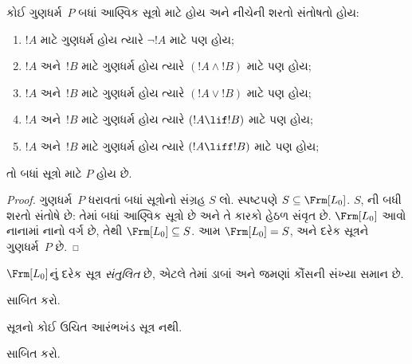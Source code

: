 \begin{thm}[\emph{સૂત્રો પર અનુમાનનો સિદ્ધાંત}]
  કોઈ ગુણધર્મ~$P$ બધાં આણ્વિક સૂત્રો માટે હોય અને નીચેની
  શરતો સંતોષતો હોય:
  \begin{enumerate}
    \item $!A$ માટે ગુણધર્મ હોય ત્યારે $\lnot !A$ માટે
      પણ હોય;
    \item $!A$ અને~$!B$ માટે ગુણધર્મ હોય ત્યારે
      $(!A \land !B)$ માટે પણ હોય;
    \item $!A$ અને~$!B$ માટે ગુણધર્મ હોય ત્યારે
      $(!A \lor !B)$ માટે પણ હોય;
    \item $!A$ અને~$!B$ માટે ગુણધર્મ હોય ત્યારે
      $(!A \lif !B)$ માટે પણ હોય;
    \item $!A$ અને~$!B$ માટે ગુણધર્મ હોય ત્યારે
      $(!A \liff !B)$ માટે પણ હોય;
  \end{enumerate}
  તો બધાં સૂત્રો માટે $P$ હોય છે.
\end{thm}

\begin{proof}
  ગુણધર્મ~$P$ ધરાવતાં બધાં સૂત્રોનો સંગ્રહ $S$ લો. સ્પષ્ટપણે
  $S \subseteq \Frm[L_0]$. $S$, ની બધી
  શરતો સંતોષે છે: તેમાં બધાં આણ્વિક સૂત્રો છે અને તે
  કારકો હેઠળ સંવૃત છે. $\Frm[L_0]$ આવો નાનામાં નાનો વર્ગ છે,
  તેથી $\Frm[L_0] \subseteq S$. આમ $\Frm[L_0]=S$, અને દરેક સૂત્રને
  ગુણધર્મ~$P$ છે.
\end{proof}

\begin{prop}
   $\Frm[L_0]$નું દરેક સૂત્ર \emph{સંતુલિત} છે, એટલે તેમાં
   ડાબાં અને જમણાં કૌંસની સંખ્યા સમાન છે.
\end{prop}

\begin{prob}
 સાબિત કરો.
\end{prob}

\begin{prop} 
સૂત્રનો કોઈ ઉચિત આરંભખંડ સૂત્ર નથી.
\end{prop}

\begin{prob}
   સાબિત કરો.
\end{prob}

